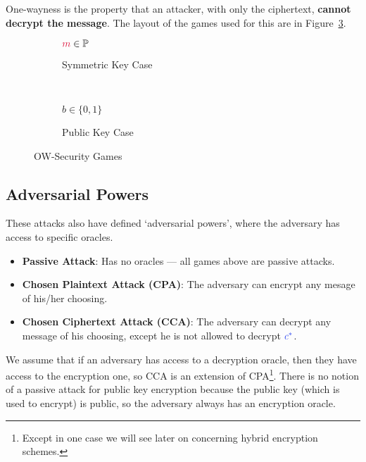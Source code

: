 One-wayness is the property that an attacker, with only the ciphertext, \textbf{cannot decrypt the message}. The layout of the games used for this are in Figure~\ref{fig:ow-sec}.

\begin{figure}[htp!]
    \centering
    \begin{subfigure}[b]{0.4\textwidth}
        \centering
        \begin{cryptogame}{$\cm\in \mathbb{P}$}
        \end{cryptogame}
        \caption{Symmetric Key  Case}
        \label{fig:ow-sec-sym}
    \end{subfigure}
    ~
    \begin{subfigure}[b]{0.4\textwidth}
        \centering
        \begin{cryptogame}{$b\in \{0,1\}$}
            \cgameright{$\cpk$}
        \end{cryptogame}
        \caption{Public Key Case}
        \label{fig:ow-sec-pub}
    \end{subfigure}
    \caption{OW-Security Games}
    \label{fig:ow-sec}
\end{figure}

\subsection{Adversarial Powers}
These attacks also have defined `adversarial powers', where the adversary has access to specific oracles.
\begin{itemize}
    \item \textbf{Passive Attack}: Has no oracles --- all games above are passive attacks.
    \item \textbf{Chosen Plaintext Attack (CPA)}: The adversary can encrypt any mesage of his/her choosing.
    \item \textbf{Chosen Ciphertext Attack (CCA)}: The adversary can decrypt any message of his choosing, except he is not allowed to decrypt $\ccast$.
\end{itemize}
We assume that if an adversary has access to a decryption oracle, then they have access to the encryption one, so CCA is an extension of CPA\footnote{Except in one case we will see later on concerning hybrid encryption schemes.}. There is no notion of a passive attack for public key encryption because the public key (which is used to encrypt) is public, so the adversary always has an encryption oracle.

